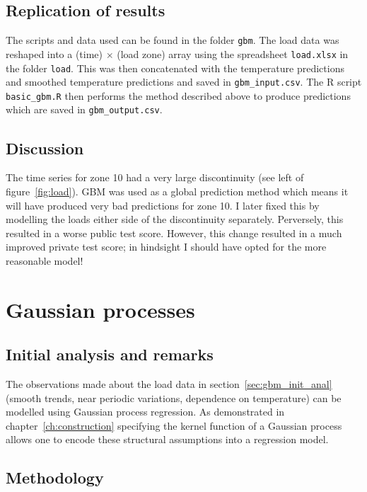 
\subsection{Replication of results}

The scripts and data used can be found in the folder \texttt{gbm}.
The load data was reshaped into a (time) $\times$ (load zone) array using the spreadsheet \texttt{load.xlsx} in the folder \texttt{load}.
This was then concatenated with the temperature predictions and smoothed temperature predictions and saved in \texttt{gbm\_input.csv}.
The R script \texttt{basic\_gbm.R} then performs the method described above to produce predictions which are saved in \texttt{gbm\_output.csv}.

\subsection{Discussion}

The time series for zone 10 had a very large discontinuity (see left of figure~\ref{fig:load}).
GBM was used as a global prediction method which means it will have produced very bad predictions for zone 10.
I later fixed this by modelling the loads either side of the discontinuity separately.
Perversely, this resulted in a worse public test score.
However, this change resulted in a much improved private test score; in hindsight I should have opted for the more reasonable model!

\section{Gaussian processes}

\label{sec:gp}

\subsection{Initial analysis and remarks}

The observations made about the load data in section~\ref{sec:gbm_init_anal} (\ie smooth trends, near periodic variations, dependence on temperature) can be modelled using Gaussian process regression.
As demonstrated in chapter~\ref{ch:construction} specifying the kernel function of a Gaussian process allows one to encode these structural assumptions into a regression model.

\subsection{Methodology}

